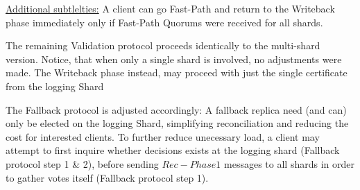 \underline{Additional subtlelties:} A client can go Fast-Path and return to the Writeback phase immediately only if Fast-Path Quorums were received for all shards. 

The remaining Validation protocol proceeds identically to the multi-shard version. Notice, that when only a single shard is involved, no adjustments were made. The Writeback phase instead, may proceed with just the single certificate from the logging Shard


The Fallback protocol is adjusted accordingly: A fallback replica need (and can) only be elected on the logging Shard, simplifying reconciliation and reducing the cost for interested clients. 
To further reduce unecessary load, a client may attempt to first inquire whether decisions exists at the logging shard (Fallback protocol step 1 \& 2), before sending $Rec-Phase1$ messages to all shards in order to gather votes itself (Fallback protocol step 1). 

